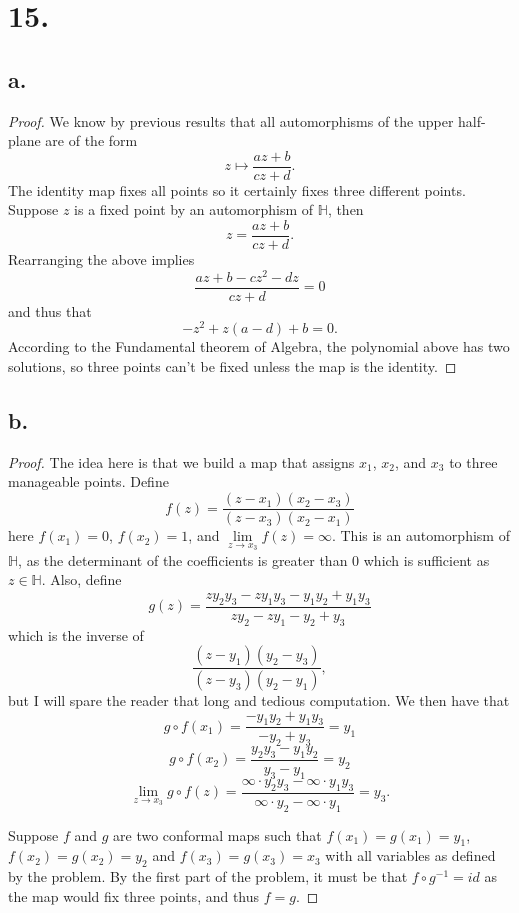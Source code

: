\documentclass{article}
\begin{document}
\section*{15.}
\subsection*{a.}
\begin{proof}
  We know by previous results that all automorphisms of the upper half-plane are of the form 
  \[
  z \mapsto \frac{az + b}{cz + d}.  
  \]
  The identity map fixes all points so it certainly fixes three different points. Suppose $z$ is a fixed point by an automorphism of $\mathbb{H}$, then 
  \[
  z = \frac{az + b}{cz + d}.  
  \]
  Rearranging the above implies 
  \[
  \frac{az + b - cz^2 - dz}{cz + d} = 0  
  \]
  and thus that 
  \[
  -z^2 + z(a - d) + b = 0.  
  \]
  According to the Fundamental theorem of Algebra, the polynomial above has two solutions, so three points can't be fixed unless the map is the identity.  
\end{proof}

\subsection*{b.}
\begin{proof}
  The idea here is that we build a map that assigns $x_1$, $x_2$, and $x_3$ to three manageable points. Define
  \[
  f(z) = \frac{(z - x_1)(x_2 - x_3)}{(z - x_3)(x_2 - x_1)}  
  \]
  here $f(x_1) = 0$, $f(x_2) = 1$, and $\lim\limits_{z \to x_3}f(z) = \infty$. This is an automorphism of $\mathbb{H}$, as the determinant of the coefficients is greater than $0$ which is sufficient as $z \in \mathbb{H}$. Also, define 
  \[
  g(z) = \frac{zy_2y_3 - zy_1y_3 - y_1y_2 + y_1y_3}{zy_2 - zy_1 - y_2 + y_3}  
  \] 
  which is the inverse of 
  \[
  \frac{(z - y_1)(y_2 - y_3)}{(z - y_3)(y_2 - y_1)},  
  \]
  but I will spare the reader that long and tedious computation. 
  We then have that 
  \[
  g \circ f(x_1) = \frac{-y_1y_2 + y_1y_3}{-y_2 + y_3} = y_1  
  \]
  \[
  g \circ f(x_2) = \frac{y_2y_3 - y_1y_2}{y_3 - y_1} = y_2  
  \]
  \[
  \lim\limits_{z \to x_3}g\circ f(z) = \frac{\infty\cdot y_2y_3 - \infty\cdot y_1 y_3}{\infty \cdot y_2 - \infty \cdot y_1} = y_3.  
  \]

  Suppose $f$ and $g$ are two conformal maps such that $f(x_1) = g(x_1) = y_1$, $f(x_2) = g(x_2) = y_2$ and $f(x_3) = g(x_3) = x_3$ with all variables as defined by the problem. By the first part of the problem, it must be that $f \circ g^{-1} = id$ as the map would fix three points, and thus $f = g$. 
\end{proof}
\end{document}
